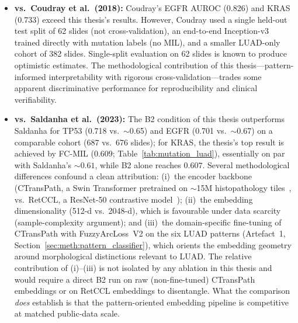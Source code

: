 \begin{itemize}
    \item \textbf{vs.\ Coudray et al.\ (2018):} Coudray's EGFR AUROC (0.826)
    and KRAS (0.733) exceed this thesis's results.
    However, Coudray used a single held-out test split of 62 slides (not
    cross-validation), an end-to-end Inception-v3 trained directly with
    mutation labels (no MIL), and a smaller LUAD-only cohort of 382 slides.
    Single-split evaluation on 62 slides is known to produce optimistic
    estimates.
    The methodological contribution of this thesis---pattern-informed
    interpretability with rigorous cross-validation---trades some apparent
    discriminative performance for reproducibility and clinical verifiability.

    \item \textbf{vs.\ Saldanha et al.\ (2023):} The B2 condition
    of this thesis outperforms Saldanha for TP53 (0.718 vs.\
    $\sim$0.65) and EGFR (0.701 vs.\ $\sim$0.67) on a comparable
    cohort (687 vs.\ 676 slides);
    for KRAS, the thesis's top result is achieved by FC-MIL
    ($0.609$; Table~\ref{tab:mutation_luad}), essentially on par
    with Saldanha's $\sim 0.61$, while B2 alone reaches $0.607$.
    Several methodological differences confound a clean attribution:
    (i)~the encoder backbone (CTransPath, a Swin Transformer
    pretrained on $\sim$15M histopathology
    tiles~\cite{wang2022ctranspath}, vs.\ RetCCL, a ResNet-50
    contrastive model~\cite{wang2023retccl});     (ii)~the embedding
    dimensionality (512-d vs.\ 2048-d), which is favourable under
    data scarcity (sample-complexity argument); and (iii)~the
    domain-specific fine-tuning of CTransPath with FuzzyArcLoss~V2
    on the six LUAD patterns (Artefact~1,
    Section~\ref{sec:meth:pattern_classifier}), which orients the
    embedding geometry around morphological distinctions relevant
    to LUAD.
    The relative contribution of (i)--(iii) is not isolated by
    any ablation in this thesis and would require a direct B2 run
    on raw (non-fine-tuned) CTransPath embeddings or on RetCCL
    embeddings to disentangle.
    What the comparison \emph{does} establish is that the
    pattern-oriented embedding pipeline is competitive at matched
    public-data scale.


\end{itemize}

